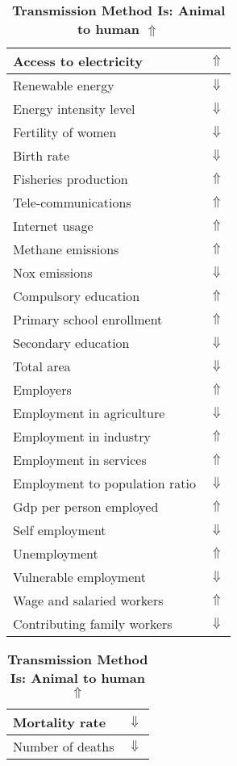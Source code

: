\documentclass[12pt,notitlepage,oneside]{report}
\begin{document}
\begin{table}[!htb]
\caption{\textbf{Transmission Method Is: Animal to human $\Uparrow$}}
\centering
\label{Correlated Socio-economic Factors0}
\begin{tabular}{|l|l|}
\hline
Access to electricity & $\Uparrow$\\ \hline
Renewable energy & $\Downarrow$\\ \hline
Energy intensity level & $\Downarrow$\\ \hline
Fertility of women & $\Downarrow$\\ \hline
Birth rate & $\Downarrow$\\ \hline
Fisheries production & $\Uparrow$\\ \hline
Tele-communications & $\Uparrow$\\ \hline
Internet usage & $\Uparrow$\\ \hline
Methane emissions & $\Uparrow$\\ \hline
Nox emissions & $\Downarrow$\\ \hline
Compulsory education & $\Uparrow$\\ \hline
Primary school enrollment & $\Uparrow$\\ \hline
Secondary education & $\Downarrow$\\ \hline
Total area & $\Downarrow$\\ \hline
Employers & $\Uparrow$\\ \hline
Employment in agriculture & $\Downarrow$\\ \hline
Employment in industry & $\Uparrow$\\ \hline
Employment in services & $\Uparrow$\\ \hline
Employment to population ratio & $\Downarrow$\\ \hline
Gdp per person employed & $\Uparrow$\\ \hline
Self employment & $\Downarrow$\\ \hline
Unemployment & $\Uparrow$\\ \hline
Vulnerable employment & $\Downarrow$\\ \hline
Wage and salaried workers & $\Uparrow$\\ \hline
Contributing family workers & $\Downarrow$\\ \hline
\end{tabular}
\begin{tabular}{|l|l|}
\hline
Mortality rate & $\Downarrow$\\ \hline
Number of deaths & $\Downarrow$\\ \hline

\end{tabular}
\end{table}
\end{document}
